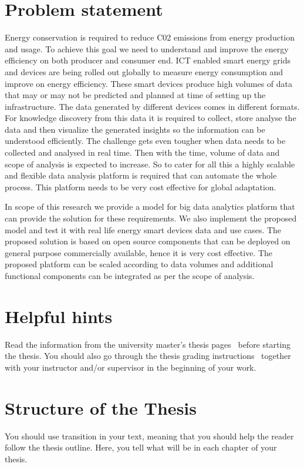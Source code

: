 \section{Problem statement}

Energy conservation is required to reduce C02 emissions from energy production and usage. To achieve this goal we need to understand and improve the energy efficiency on both producer and consumer end. ICT enabled smart energy grids and devices are being rolled out globally to measure energy consumption and improve on energy efficiency. These smart devices produce high volumes of data that may or may not be predicted and planned at time of setting up the infrastructure. The data generated by different devices comes in different formats. For knowledge discovery from this data it is required to collect, store analyse the data and then visualize the generated insights so the information can be understood efficiently. The challenge gets even tougher when data needs to be collected and analysed in real time. Then with the time, volume of data and scope of analysis is expected to increase. So to cater for all this a highly scalable and flexible data analysis platform is required that can automate the whole process. This platform needs to be very cost effective for global adaptation.
 
In scope of this research we provide a model for big data analytics platform that can provide the solution for these requirements. We also implement the proposed model and test it with real life energy smart devices data and use cases. The proposed solution is based on open source components that can be deployed on general purpose commercially available, hence it is very cost effective. The proposed platform can be scaled according to data volumes and additional functional components can be integrated as per the scope of analysis.


\section{Helpful hints}

Read the information from the university master's thesis
pages~ before starting the thesis.  You
should also go through the thesis grading
instructions~ together with your instructor and/or
supervisor in the beginning of your work.

\section{Structure of the Thesis}
\label{section:structure} 

You should use transition in your text, meaning that you should help
the reader follow the thesis outline. Here, you tell what will be in
each chapter of your thesis. 

